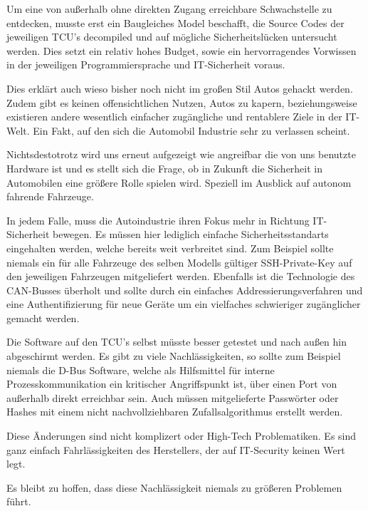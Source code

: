 \documentclass[
    fontsize=12pt,
    headings=small,
    parskip=half,           %
    bibliography=totoc,9
    numbers=noenddot,       %
    open=any,               %
    ]{scrreprt}
\begin{document}
Um eine von außerhalb ohne direkten Zugang erreichbare Schwachstelle zu entdecken, musste erst ein Baugleiches Model beschafft, die Source Codes der jeweiligen TCU's decompiled und auf mögliche Sicherheitslücken untersucht werden. Dies setzt ein relativ hohes Budget, sowie ein hervorragendes Vorwissen in der jeweiligen Programmiersprache und IT-Sicherheit voraus.

Dies erklärt auch wieso bisher noch nicht im großen Stil Autos gehackt werden. Zudem gibt es keinen offensichtlichen Nutzen, Autos zu kapern, beziehungsweise existieren andere wesentlich einfacher zugängliche und rentablere Ziele in der IT-Welt. Ein Fakt, auf den sich die Automobil Industrie sehr zu verlassen scheint.

Nichtsdestotrotz wird uns erneut aufgezeigt wie angreifbar die von uns benutzte Hardware ist und es stellt sich die Frage, ob in Zukunft die Sicherheit in Automobilen eine größere Rolle spielen wird. Speziell im Ausblick auf autonom fahrende Fahrzeuge.

In jedem Falle, muss die Autoindustrie ihren Fokus mehr in Richtung IT-Sicherheit bewegen. Es müssen hier lediglich einfache Sicherheitsstandarts eingehalten werden, welche bereits weit verbreitet sind. Zum Beispiel sollte niemals ein für alle Fahrzeuge des selben Modells gültiger SSH-Private-Key auf den jeweiligen Fahrzeugen mitgeliefert werden. Ebenfalls ist die Technologie des CAN-Busses überholt und sollte durch ein einfaches Addressierungsverfahren und eine Authentifizierung für neue Geräte um ein vielfaches schwieriger zugänglicher gemacht werden.

Die Software auf den TCU's selbst müsste besser getestet und nach außen hin abgeschirmt werden. Es gibt zu viele Nachlässigkeiten, so sollte zum Beispiel niemals die D-Bus Software, welche als Hilfsmittel für interne Prozesskommunikation ein kritischer Angriffspunkt ist, über einen Port von außerhalb direkt erreichbar sein.
Auch müssen mitgelieferte Passwörter oder Hashes mit einem nicht nachvollziehbaren Zufallsalgorithmus erstellt werden.

Diese Änderungen sind nicht komplizert oder High-Tech Problematiken. Es sind ganz einfach Fahrlässigkeiten des Herstellers, der auf IT-Security keinen Wert legt.

Es bleibt zu hoffen, dass diese Nachlässigkeit niemals zu größeren Problemen führt.


\end{document}
